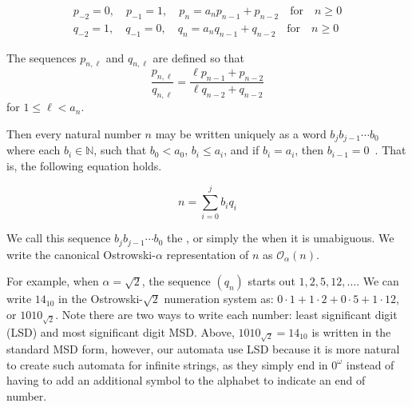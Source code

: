 \begin{equation}\label{eqn:conv-def}
\begin{split}
    p_{-2} = 0, \quad p_{-1} = 1, \quad p_n = a_n p_{n-1} + p_{n-2} \quad \text{for} \quad n \geq 0\\
    q_{-2} = 1, \quad q_{-1} = 0, \quad q_n = a_n q_{n-1} + q_{n-2} \quad \text{for} \quad n \geq 0
\end{split}
\end{equation}



The  sequences $p_{n,\ell}$ and $q_{n,\ell}$ are defined so that
\[
    \frac{p_{n,\ell}}{q_{n,\ell}} = \frac{\ell p_{n-1} + p_{n-2}}{\ell q_{n-2} + q_{n-2}}
\]
for $1 \leq \ell < a_n$.

Then every natural number $n$ may be written uniquely as a word $b_j b_{j-1} \cdots b_0$ where each $b_i \in \mathbb{N}$, such that $b_0 < a_0$, $b_i \leq a_i$, and if $b_i = a_i$, then $b_{i-1} = 0$~\cite{Ostrowski1922}.
That is, the following equation holds.

\begin{equation*}\label{eqn:ostrowski-def}
    n = \sum_{i=0}^j b_i q_i
\end{equation*}

We call this sequence $b_j b_{j-1} \cdots b_0$ the , or simply the  when it is umabiguous.
We write the canonical Ostrowski-$\alpha$ representation of $n$ as $\mathcal{O}_{\alpha}(n)$.

For example, when $\alpha = \sqrt{2}$, the sequence $(q_n)$ starts out $1,2,5,12,\ldots$.
We can write $14_{10}$ in the Ostrowski-$\sqrt{2}$ numeration system as: $0\cdot1 + 1\cdot2 + 0\cdot5 + 1\cdot12$, or $1010_{\sqrt{2}}$.
Note there are two ways to write each number: least significant digit (LSD) and most significant digit MSD.
Above, $1010_{\sqrt{2}} = 14_{10}$ is written in the standard MSD form, however, our automata use LSD because it is more natural to create such automata for infinite strings, as they simply end in $0^\omega$ instead of having to add an additional symbol to the alphabet to indicate an end of number.

